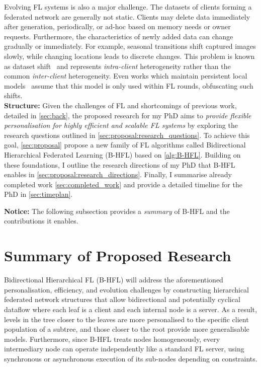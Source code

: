 Evolving FL systems is also a major challenge. The datasets of clients forming a federated network are generally not static. Clients may delete data immediately after generation, periodically, or ad-hoc based on memory needs or owner requests. Furthermore, the characteristics of newly added data can change gradually or immediately. For example, seasonal transitions shift captured images slowly, while changing locations leads to discrete changes. This problem is known as dataset shift~\citep[sec. 3.1]{AdvancedAndOpenProblems} and represents \emph{intra-client} heterogeneity rather than the common \emph{inter-client} heterogeneity. Even works which maintain persistent local models~\citep{Ditto,FlWithPersonalisationLayers,AdaptivePersonalisedFederatedLearning,FederatedLearningMixtureOfGlobalAndLocal} assume that this model is only used within FL rounds, obfuscating such shifts.\\

\noindent \textbf{Structure:} Given the challenges of FL and shortcomings of previous work, detailed in \cref{sec:back}, the proposed research for my PhD aims to \emph{provide flexible personalisation for highly efficient and scalable FL systems} by exploring the research questions outlined in \cref{sec:proposal:research_questions}. To achieve this goal, \cref{sec:proposal} propose a new family of FL algorithms called Bidirectional Hierarchical Federated Learning (B-HFL) based on \cref{alg:B-HFL}. Building on these foundations, I outline the research directions of my PhD that B-HFL enables in \cref{sec:proposal:research_directions}. Finally, I summarise already completed work \cref{sec:completed_work} and provide a detailed timeline for the PhD in \cref{sec:timeplan}.

\noindent \textbf{Notice:} The following subsection provides a \emph{summary} of B-HFL and the contributions it enables.
\section{Summary of Proposed Research}
Bidirectional Hierarchical FL (B-HFL) will address the aforementioned personalisation, efficiency, and evolution challenges by constructing hierarchical federated network structures that allow bidirectional and potentially cyclical dataflow where each leaf is a client and each internal node is a server. As a result, levels in the tree closer to the leaves are more personalised to the specific client population of a subtree, and those closer to the root provide more generalisable models. Furthermore, since B-HFL treats nodes homogeneously, every intermediary node can operate independently like a standard FL server, using synchronous or asynchronous execution of its sub-nodes depending on constraints.

